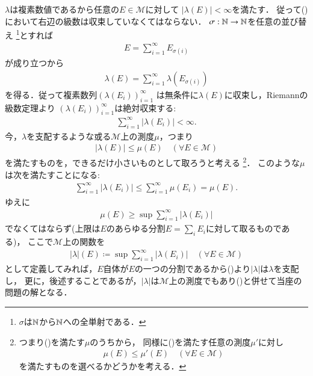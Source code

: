 	$\lambda$は複素数値であるから任意の$E \in \mathcal{M}$に対して
	$|\lambda(E)| < \infty$を満たす．
	従って()において右辺の級数は収束していなくてはならない．
	$\sigma:\mathbb{N} \rightarrow \mathbb{N}$を任意の並び替え
	\footnote{
		$\sigma$は$\mathbb{N}$から$\mathbb{N}$への全単射である．
	}とすれば
	\begin{align}
		E = \sum_{i=1}^{\infty}E_{\sigma(i)}
	\end{align}
	が成り立つから
	\begin{align}
		\lambda(E) = \sum_{i=1}^{\infty} \lambda(E_{\sigma(i)})
	\end{align}
	を得る．従って複素数列$\left( \lambda(E_i) \right)_{i=1}^{\infty}$
	は無条件に$\lambda(E)$に収束し，Riemannの級数定理より
	$\left( \lambda(E_i) \right)_{i=1}^{\infty}$は絶対収束する:
	\begin{align}
		\sum_{i=1}^{\infty} |\lambda(E_i)| < \infty.
	\end{align}
	今，$\lambda$を支配するような或る$\mathcal{M}$上の測度$\mu$，つまり
	\begin{align}
		|\lambda(E)| \leq \mu(E) \quad (\forall E \in \mathcal{M})
		\label{radon_nikodym_1}
	\end{align}
	を満たすものを，できるだけ小さいものとして取ろうと考える
	\footnote{
		つまり()を満たす$\mu$のうちから，
		同様に()を満たす任意の測度$\mu'$に対し
		\begin{align}
			\mu(E) \leq \mu'(E) \quad (\forall E \in \mathcal{M})
		\end{align}
		を満たすものを選べるかどうかを考える．
	}．
	このような$\mu$は次を満たすことになる:
	\begin{align}
		\sum_{i=1}^{\infty} |\lambda(E_i)| \leq \sum_{i=1}^{\infty} \mu(E_i) = \mu(E).
	\end{align}
	ゆえに
	\begin{align}
		\mu(E) \geq \sup{}{\sum_{i=1}^{\infty} |\lambda(E_i)|} 
		\label{radon_nikodym_2}
	\end{align}
	でなくてはならず(上限は$E$のあらゆる分割$E = \sum_{i}E_i$に対して取るものである)，
	ここで$\mathcal{M}$上の関数を
	\begin{align}
		|\lambda|(E) \coloneqq \sup{}{\sum_{i=1}^{\infty} |\lambda(E_i)|} \quad (\forall E \in \mathcal{M})
		\label{radon_nikodym_3}
	\end{align}
	として定義してみれば，$E$自体が$E$の一つの分割であるから()より$|\lambda|$は$\lambda$を支配し，
	更に，後述することであるが，$|\lambda|$は$\mathcal{M}$上の測度でもあり()と併せて当座の問題の解となる．
	

